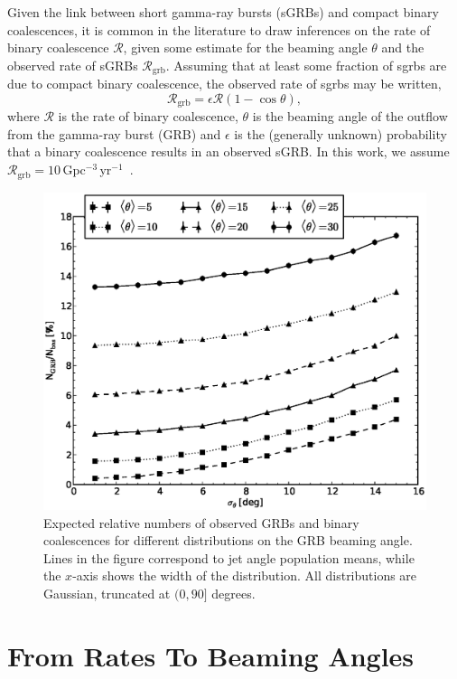 \documentclass[twocolumn,nofootinbib]{revtex4-1}
\newcommand{\grbrate}{{{\mathcal R}_{\mathrm{grb}}}}
\newcommand{\cbcrate}{{{\mathcal R}}}
\def\grb#1{gamma-ray burst#1 (GRB#1)\gdef\grb{GRB}}
\def\sgrb#1{short gamma-ray burst#1 (sGRB#1)\gdef\sgrb{sGRB}}
\begin{document}
Given the link between \sgrb{s} and compact binary coalescences, it is common in the literature to draw inferences on the rate of binary
coalescence $\cbcrate$, given some estimate for the beaming angle $\theta$ and
the observed rate of \sgrb{s} $\grbrate$. 
Assuming that at least some fraction of sgrb{s} are due to compact binary
coalescence, the observed rate of sgrb{s} may be written,
%
\begin{equation}\label{eq:rate2angle}
\grbrate=\epsilon\cbcrate(1-\cos \theta),
\end{equation}
%
where $\cbcrate$ is the rate of binary coalescence, $\theta$ is the beaming
angle of the outflow from the \grb{} and $\epsilon$ is the (generally unknown)
probability that a binary coalescence results in an observed \sgrb{}.  In this
work, we assume
$\grbrate=10$\,Gpc$^{-3}$\,yr$^{-1}$~\cite{nakar-2007,Dietz11}.
 

\begin{figure}
\centering
\includegraphics[width=\linewidth]{theta_dist_grbfrac.eps}
\caption{\label{fig:thetapopulation} Expected relative
numbers of observed GRBs and binary coalescences for different distributions
on the GRB beaming angle.  Lines in the figure correspond to jet angle
population means, while the $x$-axis shows the width of the distribution.  All 
distributions are Gaussian, truncated at $(0, 90]$ degrees.}
\end{figure}


\section{From Rates To Beaming Angles}
\end{document}
